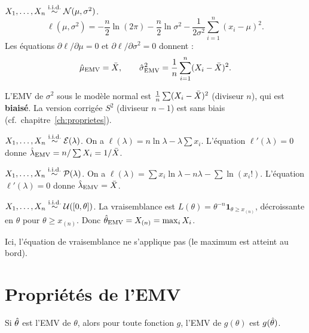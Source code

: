 \begin{exemple}
\label{ex:emv-normale}
$X_1,\ldots,X_n\overset{\text{i.i.d.}}{\sim}\mathcal{N}(\mu,\sigma^2)$.
\[
\ell(\mu,\sigma^2) = -\frac{n}{2}\ln(2\pi) - \frac{n}{2}\ln\sigma^2 - \frac{1}{2\sigma^2}\sum_{i=1}^n(x_i-\mu)^2.
\]
Les \'equations $\partial\ell/\partial\mu=0$ et $\partial\ell/\partial\sigma^2=0$ donnent :
\[
\hat{\mu}_{\mathrm{EMV}} = \bar{X}, \qquad \hat{\sigma}^2_{\mathrm{EMV}} = \frac{1}{n}\sum_{i=1}^n(X_i-\bar{X})^2.
\]
\end{exemple}

\begin{attention}
L'EMV de $\sigma^2$ sous le mod\`ele normal est $\frac{1}{n}\sum(X_i-\bar{X})^2$ (diviseur $n$), qui est \textbf{biais\'e}. La version corrig\'ee $S^2$ (diviseur $n-1$) est sans biais (cf.\ chapitre~\ref{ch:proprietes}).
\end{attention}

\begin{exemple}
$X_1,\ldots,X_n\overset{\text{i.i.d.}}{\sim}\mathcal{E}(\lambda)$. On a $\ell(\lambda)=n\ln\lambda-\lambda\sum x_i$. L'\'equation $\ell'(\lambda)=0$ donne $\hat{\lambda}_{\mathrm{EMV}}=n/\sum X_i = 1/\bar{X}$.
\end{exemple}

\begin{exemple}
$X_1,\ldots,X_n\overset{\text{i.i.d.}}{\sim}\mathcal{P}(\lambda)$. On a $\ell(\lambda)=\sum x_i\ln\lambda - n\lambda - \sum\ln(x_i!)$. L'\'equation $\ell'(\lambda)=0$ donne $\hat{\lambda}_{\mathrm{EMV}}=\bar{X}$.
\end{exemple}

\begin{exemple}
$X_1,\ldots,X_n\overset{\text{i.i.d.}}{\sim}\mathcal{U}([0,\theta])$. La vraisemblance est $L(\theta)=\theta^{-n}\mathbf{1}_{\theta\geq x_{(n)}}$, d\'ecroissante en $\theta$ pour $\theta\geq x_{(n)}$. Donc $\hat{\theta}_{\mathrm{EMV}}=X_{(n)}=\max_i X_i$.

Ici, l'\'equation de vraisemblance ne s'applique pas (le maximum est atteint au bord).
\end{exemple}

\section{Propri\'et\'es de l'EMV}

\begin{theoreme}
Si $\hat{\theta}$ est l'EMV de $\theta$, alors pour toute fonction $g$, l'EMV de $g(\theta)$ est $g(\hat{\theta})$.
\end{theoreme}

